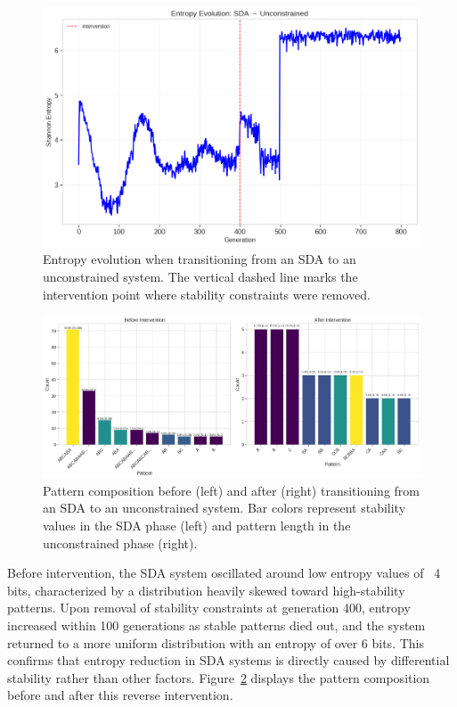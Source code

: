 \documentclass[preprint,12pt]{elsarticle}
\begin{document}
\begin{figure}[h]
    \centering
    \includegraphics[width=1\textwidth]{sda_to_unconstrained_entropy.png}
    \caption{Entropy evolution when transitioning from an SDA to an unconstrained system. The vertical dashed line marks the intervention point where stability constraints were removed.}
    \label{fig:s2u-entropy}
\end{figure}

\begin{figure}[h]
    \centering
    \includegraphics[width=1\textwidth]{sda_to_unconstrained_population_comparison.png}
    \caption{Pattern composition before (left) and after (right) transitioning from an SDA to an unconstrained system. Bar colors represent stability values in the SDA phase (left) and pattern length in the unconstrained phase (right).}
    \label{fig:s2u-patterns}
\end{figure}


Before intervention, the SDA system oscillated around low entropy values of ~4 bits, characterized by a distribution heavily skewed toward high-stability patterns. Upon removal of stability constraints at generation 400, entropy increased within 100 generations as stable patterns died out, and the system returned to a more uniform distribution with an entropy of over 6 bits. This confirms that entropy reduction in SDA systems is directly caused by differential stability rather than other factors. Figure~\ref{fig:s2u-patterns} displays the pattern composition before and after this reverse intervention.
\end{document}

